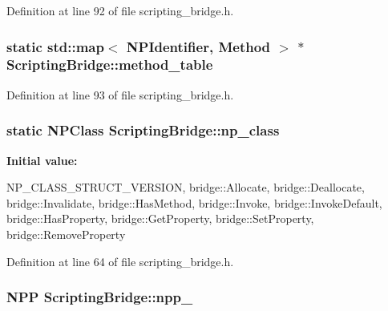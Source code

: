 Definition at line 92 of file scripting\_\-bridge.h.

\hypertarget{classbridge_1_1_scripting_bridge_a1057c4c6b923babcbc62a5732d2c3235}{
\subsubsection[{method\_\-table}]{\setlength{\rightskip}{0pt plus 5cm}static std::map$<$ NPIdentifier, {\bf Method} $>$ $\ast$ {\bf ScriptingBridge::method\_\-table}}}
\label{classbridge_1_1_scripting_bridge_a1057c4c6b923babcbc62a5732d2c3235}


Definition at line 93 of file scripting\_\-bridge.h.

\hypertarget{classbridge_1_1_scripting_bridge_a7a3e8318e9e315a116729cebceac5fd9}{
\subsubsection[{np\_\-class}]{\setlength{\rightskip}{0pt plus 5cm}static NPClass {\bf ScriptingBridge::np\_\-class}}}
\label{classbridge_1_1_scripting_bridge_a7a3e8318e9e315a116729cebceac5fd9}
{\bfseries Initial value:}
\begin{DoxyCode}
 {
  NP_CLASS_STRUCT_VERSION,
  bridge::Allocate,
  bridge::Deallocate,
  bridge::Invalidate,
  bridge::HasMethod,
  bridge::Invoke,
  bridge::InvokeDefault,
  bridge::HasProperty,
  bridge::GetProperty,
  bridge::SetProperty,
  bridge::RemoveProperty
}
\end{DoxyCode}


Definition at line 64 of file scripting\_\-bridge.h.

\hypertarget{classbridge_1_1_scripting_bridge_a122d088702ccb290a91a0cb1c507fbbe}{
\subsubsection[{npp\_\-}]{\setlength{\rightskip}{0pt plus 5cm}NPP {\bf ScriptingBridge::npp\_\-}}}
\label{classbridge_1_1_scripting_bridge_a122d088702ccb290a91a0cb1c507fbbe}


